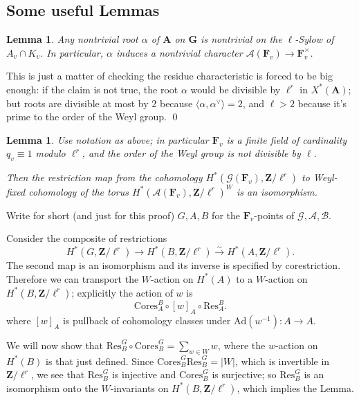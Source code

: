\documentclass[10pt]{amsart}
\newcommand{\Z}{\mathbf{Z}}
\newcommand{\Ad}{\mathrm{Ad}}
\newtheorem{lemma}[subsection]{Lemma}
\theoremstyle{remark}
\begin{document}
%
%
%
%
%
%
%
%
%
%
%
%
%
%
%
%
%
%
%
%
%
%
%
%
%
%
%
%
%
%
\subsection{Some useful Lemmas}
 
\begin{lemma} \label{nontriv}
Any nontrivial root  $\alpha$ of $\mathbf{A}$ on $\mathbf{G}$ is nontrivial
on the $\ell$-Sylow of $A_v \cap K_v$. In particular, $\alpha$ induces a nontrivial
character  $\mathcal{A}(\mathbf{F}_v) \rightarrow \mathbf{F}_v^{\times}$. 
\end{lemma}
\proof
This is just a matter of checking the residue characteristic is forced to be big enough:
if the claim is not true,  the root $\alpha$ would be divisible 
 by $\ell^r$ in $X^*(\mathbf{A})$;  but roots are divisible at most by $2$ because $\langle \alpha, \alpha^{\vee} \rangle =2$, 
 and $\ell > 2$ because it's prime to the order of the Weyl group.
 \qed

 \begin{lemma}\label{finitefields} 
Use notation as above; in particular $\mathbf{F}_v$ is a finite field of cardinality $q_v \equiv 1$ modulo $\ell^r$,
and the order of the Weyl group is not divisible by $\ell$. 

Then the restriction map from the cohomology $H^*(\mathcal{G}(\mathbf{F}_v), \Z/\ell^r)$    to Weyl-fixed cohomology of the torus $H^*(\mathcal{A}(\mathbf{F}_v), \Z/\ell^r)^W$
is an isomorphism.
\end{lemma}

\proof   Write for short  (and just for this proof) $G, A,B$ for the $\mathbf{F}_v$-points of $\mathcal{G}, \mathcal{A}, \mathcal{B}$.

 Consider the composite of restrictions 
\begin{equation} \label{sequence} H^*(G,  \Z/\ell^r)  \rightarrow H^*(B, \Z/\ell^r) \stackrel{\sim}{ \rightarrow} H^*(A, \Z/\ell^r).\end{equation}
The second map is an isomorphism and its inverse is specified by corestriction. 
Therefore we can transport the $W$-action on $H^*(A)$  to a $W$-action on $H^*(B, \Z/\ell^r)$; explicitly the action of $w$ is
\begin{equation} \label{w} \mathrm{Cores}^B_A \circ  [w]_A \circ \mathrm{Res}^{B}_A .\end{equation} 
where $[w]_A$ is pullback of cohomology classes under $\Ad(w^{-1}): A \rightarrow A$. 

We will now show that $\mathrm{Res}^G_B \circ \mathrm{Cores}^{G}_B = \sum_{w \in W} w$,
where the $w$-action on $H^*(B)$ is that just defined. 
Since $\mathrm{Cores}^{G}_B \mathrm{Res}^G_B = |W|$, which is invertible in $\Z/\ell^r$,
we see that $\mathrm{Res}^G_B$ is injective and $\mathrm{Cores}^G_B$ is surjective; so 
  $\mathrm{Res}^G_B$ is an isomorphism onto the $W$-invariants on $H^*(B, \Z/\ell^r)$,
  which implies the Lemma.  
   
\end{document}
